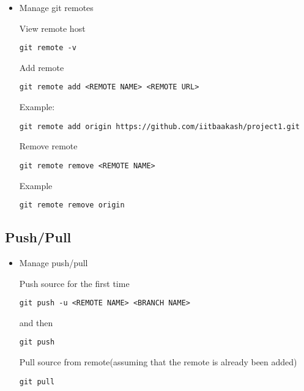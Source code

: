 \documentclass[11pt]{article}
\begin{document}
\begin{itemize}
\item Manage git remotes

      View remote host

\begin{verbatim}
git remote -v
\end{verbatim}

      Add remote

\begin{verbatim}
git remote add <REMOTE NAME> <REMOTE URL>
\end{verbatim}
      Example:

\begin{verbatim}
git remote add origin https://github.com/iitbaakash/project1.git
\end{verbatim}
    
      Remove remote

\begin{verbatim}
git remote remove <REMOTE NAME>
\end{verbatim}
      Example

\begin{verbatim}
git remote remove origin
\end{verbatim}
\end{itemize}
\subsection{Push/Pull}
\label{sec-2-4}

\begin{itemize}
\item Manage push/pull

      Push source for the first time

\begin{verbatim}
git push -u <REMOTE NAME> <BRANCH NAME>
\end{verbatim}
    
      and then

\begin{verbatim}
git push
\end{verbatim}

      Pull source from remote(assuming that the remote is already been added)

\begin{verbatim}
git pull
\end{verbatim}
\end{itemize}
    
\end{document}
